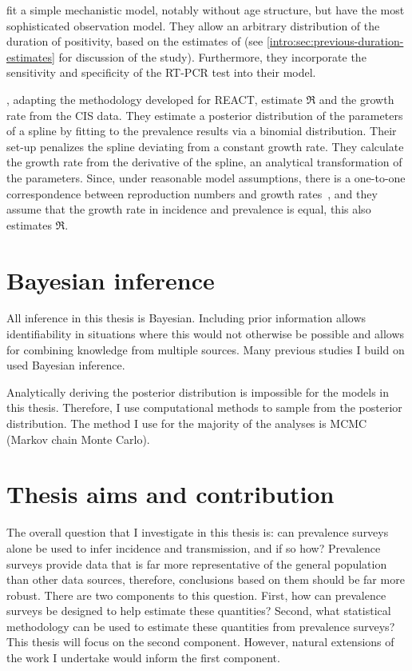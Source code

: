 \documentclass[thesis.tex]{subfiles}
\begin{document}
\Textcite{nicholsonImproving} fit a simple mechanistic model, notably without age structure, but have the most sophisticated observation model.
They allow an arbitrary distribution of the duration of positivity, based on the estimates of \textcite{hellewellPCRSensitivity} (see \cref{intro:sec:previous-duration-estimates} for discussion of the \textcite{hellewellPCRSensitivity} study).
Furthermore, they incorporate the sensitivity and specificity of the RT-PCR test into their model.

\Textcite{mccabeCISincidence}, adapting the methodology \textcite{ealesAppropriately} developed for REACT, estimate $\Re$ and the growth rate from the CIS data.
They estimate a posterior distribution of the parameters of a spline by fitting to the prevalence results via a binomial distribution.
Their set-up penalizes the spline deviating from a constant growth rate.
They calculate the growth rate from the derivative of the spline, an analytical transformation of the parameters. 
Since, under reasonable model assumptions, there is a one-to-one correspondence between reproduction numbers and growth rates~\autocite{wallingaGI}, and they assume that the growth rate in incidence and prevalence is equal, this also estimates $\Re$.

\section{Bayesian inference} \label{intro:sec:Bayes}

All inference in this thesis is Bayesian.
Including prior information allows identifiability in situations where this would not otherwise be possible and allows for combining knowledge from multiple sources.
Many previous studies I build on used Bayesian inference.

Analytically deriving the posterior distribution is impossible for the models in this thesis.
Therefore, I use computational methods to sample from the posterior distribution.
The method I use for the majority of the analyses is MCMC (Markov chain Monte Carlo).

\section{Thesis aims and contribution} \label{intro:sec:aims}

The overall question that I investigate in this thesis is: can prevalence surveys alone be used to infer incidence and transmission, and if so how?
Prevalence surveys provide data that is far more representative of the general population than other data sources, therefore, conclusions based on them should be far more robust.
There are two components to this question.
First, how can prevalence surveys be designed to help estimate these quantities?
Second, what statistical methodology can be used to estimate these quantities from prevalence surveys?
This thesis will focus on the second component.
However, natural extensions of the work I undertake would inform the first component.
\end{document}
